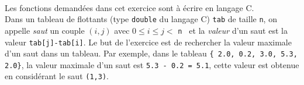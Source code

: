 \documentclass[11pt,a4paper]{article}
\begin{document}
\begin{Exercise}[title = {Recherche des $k$ premiers maximums d'une liste}]
  \ifcorrige
  \fi
\end{Exercise}


\begin{Exercise}[title={Saut de valeur maximale}, origin={\bac {\sc capes nsi 2023}}]\\
	Les fonctions demandées dans cet exercice sont à écrire en langage C. \smallskip \\
	Dans un tableau de flottants (type {\tt double} du langage C) {\tt tab} de taille {\tt n}, on appelle \textit{saut} un couple $(i,j)$ avec $0 \leq i \leq j <$ {\tt n  } et la \textit{valeur} d'un saut est la valeur {\tt tab[j]-tab[i]}. Le but de l'exercice est de rechercher la valeur maximale d'un saut dans un tableau. Par exemple, dans le tableau {\tt \{ 2.0, 0.2, 3.0, 5.3, 2.0\}}, la valeur maximale d'un saut est {\tt 5.3 - 0.2 = 5.1}, cette valeur est obtenue en considérant le saut {\tt (1,3)}.\medskip


\end{Exercise}
\end{document}
